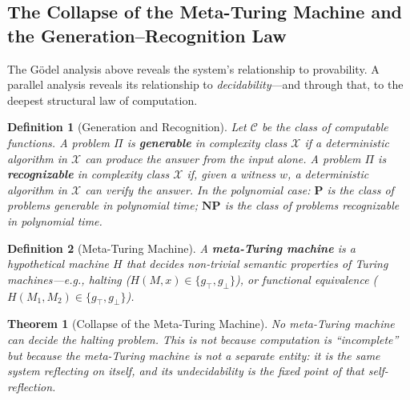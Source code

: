 \documentclass[12pt, letterpaper]{book}
\def\mathfrak#1{#1}%
\newtheorem{theorem}{Theorem}[chapter]
\newtheorem{definition}{Definition}[chapter]
\begin{document}
\subsection{The Collapse of the Meta-Turing Machine and the Generation--Recognition Law}

The Gödel analysis above reveals the system's relationship to provability. A parallel analysis reveals its relationship to \textit{decidability}---and through that, to the deepest structural law of computation.

\begin{definition}[Generation and Recognition]\label{def:gen-rec}
Let $\mathcal{C}$ be the class of computable functions. A problem $\Pi$ is \textbf{generable} in complexity class $\mathcal{X}$ if a deterministic algorithm in $\mathcal{X}$ can produce the answer from the input alone. A problem $\Pi$ is \textbf{recognizable} in complexity class $\mathcal{X}$ if, given a witness $w$, a deterministic algorithm in $\mathcal{X}$ can verify the answer. In the polynomial case: $\mathbf{P}$ is the class of problems generable in polynomial time; $\mathbf{NP}$ is the class of problems recognizable in polynomial time.
\end{definition}

\begin{definition}[Meta-Turing Machine]\label{def:meta-tm}
A \textbf{meta-Turing machine} is a hypothetical machine $H$ that decides non-trivial semantic properties of Turing machines---e.g., halting ($H(M,x) \in \{\mathfrak{g}_\top, \mathfrak{g}_\bot\}$), or functional equivalence ($H(M_1, M_2) \in \{\mathfrak{g}_\top, \mathfrak{g}_\bot\}$).
\end{definition}

\begin{theorem}[Collapse of the Meta-Turing Machine]\label{thm:meta-tm-collapse}
No meta-Turing machine can decide the halting problem. This is not because computation is ``incomplete'' but because the meta-Turing machine is not a separate entity: it is the same system reflecting on itself, and its undecidability is the fixed point of that self-reflection.
\end{theorem}
\end{document}
